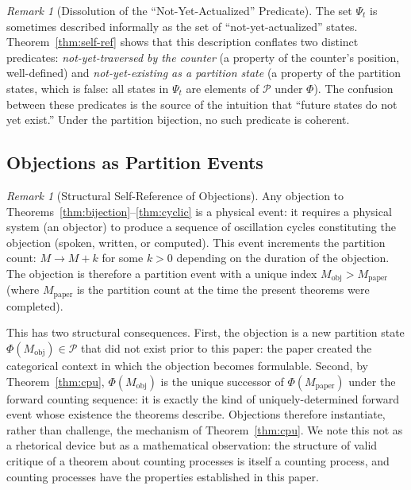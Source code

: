 \documentclass[twocolumn,10pt,a4paper]{article}
\theoremstyle{thmstyle}
\theoremstyle{definition}
\theoremstyle{remark}
\newtheorem{remark}[theorem]{Remark}
\newcommand{\Parts}{\mathcal{P}}
\newcommand{\PhiMap}{\varPhi}
\begin{document}
\begin{remark}[Dissolution of the ``Not-Yet-Actualized'' Predicate]
The set $\Psi_t$ is sometimes described informally as the set of ``not-yet-actualized'' states. Theorem~\ref{thm:self-ref} shows that this description conflates two distinct predicates: \emph{not-yet-traversed by the counter} (a property of the counter's position, well-defined) and \emph{not-yet-existing as a partition state} (a property of the partition states, which is false: all states in $\Psi_t$ are elements of $\Parts$ under $\PhiMap$). The confusion between these predicates is the source of the intuition that ``future states do not yet exist.'' Under the partition bijection, no such predicate is coherent.
\end{remark}

\subsection{Objections as Partition Events}

\begin{remark}[Structural Self-Reference of Objections]
\label{rem:self-ref}
Any objection to Theorems~\ref{thm:bijection}--\ref{thm:cyclic} is a physical event: it requires a physical system (an objector) to produce a sequence of oscillation cycles constituting the objection (spoken, written, or computed). This event increments the partition count: $M \to M + k$ for some $k > 0$ depending on the duration of the objection. The objection is therefore a partition event with a unique index $M_{\mathrm{obj}} > M_{\mathrm{paper}}$ (where $M_{\mathrm{paper}}$ is the partition count at the time the present theorems were completed).

This has two structural consequences. First, the objection is a new partition state $\PhiMap(M_{\mathrm{obj}}) \in \Parts$ that did not exist prior to this paper: the paper created the categorical context in which the objection becomes formulable. Second, by Theorem~\ref{thm:cpu}, $\PhiMap(M_{\mathrm{obj}})$ is the unique successor of $\PhiMap(M_{\mathrm{paper}})$ under the forward counting sequence: it is exactly the kind of uniquely-determined forward event whose existence the theorems describe. Objections therefore instantiate, rather than challenge, the mechanism of Theorem~\ref{thm:cpu}. We note this not as a rhetorical device but as a mathematical observation: the structure of valid critique of a theorem about counting processes is itself a counting process, and counting processes have the properties established in this paper.
\end{remark}
\end{document}
